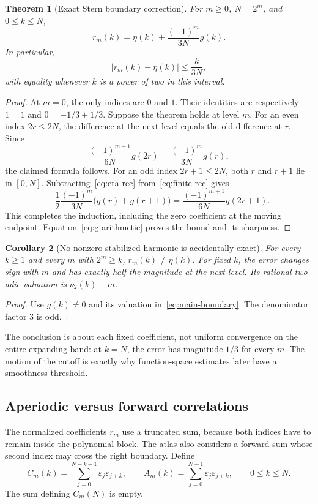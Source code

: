 \documentclass[11pt,a4paper]{article}
\numberwithin{equation}{section}
\newtheorem{theorem}{Theorem}[section]
\newtheorem{corollary}[theorem]{Corollary}
\theoremstyle{definition}
\theoremstyle{remark}
\newcommand{\eps}{\varepsilon}
\newcommand{\vnu}{\nu_2}
\begin{document}
\begin{theorem}[Exact Stern boundary correction]
\label{thm:boundary}
For $m\ge0$, $N=2^m$, and $0\le k\le N$,
\begin{equation}
 \boxed{\quad r_m(k)=\eta(k)+\frac{(-1)^m}{3N}g(k).\quad}
 \label{eq:main-boundary}
\end{equation}
In particular,
\begin{equation}
 |r_m(k)-\eta(k)|\le\frac{k}{3N},
 \label{eq:sharp-mode-bound}
\end{equation}
with equality whenever $k$ is a power of two in this interval.
\end{theorem}
\begin{proof}
At $m=0$, the only indices are $0$ and $1$. Their identities are respectively
$1=1$ and $0=-1/3+1/3$. Suppose the theorem holds at level $m$.
For an even index $2r\le2N$, the difference at the next level equals the old
difference at $r$. Since
\[
 \frac{(-1)^{m+1}}{6N}g(2r)
 =\frac{(-1)^m}{3N}g(r),
\]
the claimed formula follows. For an odd index $2r+1\le2N$, both $r$ and $r+1$
lie in $[0,N]$. Subtracting~\eqref{eq:eta-rec} from~\eqref{eq:finite-rec} gives
\[
 -\frac12\frac{(-1)^m}{3N}\bigl(g(r)+g(r+1)\bigr)
 =\frac{(-1)^{m+1}}{6N}g(2r+1).
\]
This completes the induction, including the zero coefficient at the moving
endpoint. Equation~\eqref{eq:g-arithmetic} proves the bound and its sharpness.
\end{proof}

\begin{corollary}[No nonzero stabilized harmonic is accidentally exact]
For every $k\ge1$ and every $m$ with $2^m\ge k$, $r_m(k)\ne\eta(k)$.
For fixed $k$, the error changes sign with $m$ and has exactly half the magnitude
at the next level. Its rational two-adic valuation is $\vnu(k)-m$.
\end{corollary}
\begin{proof}
Use $g(k)\ne0$ and its valuation in~\eqref{eq:main-boundary}. The denominator
factor $3$ is odd.
\end{proof}

The conclusion is about each fixed coefficient, not uniform convergence on the
entire expanding band: at $k=N$, the error has magnitude $1/3$ for every $m$.
The motion of the cutoff is exactly why function-space estimates later have a
smoothness threshold.

\subsection{Aperiodic versus forward correlations}
The normalized coefficients $r_m$ use a truncated sum, because both indices have
to remain inside the polynomial block. The atlas also considers a forward sum
whose second index may cross the right boundary. Define
\begin{equation}
 C_m(k)=\sum_{j=0}^{N-k-1}\eps_j\eps_{j+k},\qquad
 A_m(k)=\sum_{j=0}^{N-1}\eps_j\eps_{j+k},\qquad 0\le k\le N.
 \label{eq:two-correlations}
\end{equation}
The sum defining $C_m(N)$ is empty.
\end{document}
